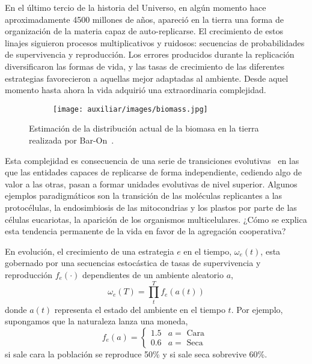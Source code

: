 \documentclass[a4paper,10pt]{article}
\begin{document}
En el último tercio de la historia del Universo, en algún momento hace aproximadamente 4500 millones de años, apareció en la tierra una forma de organización de la materia capaz de auto-replicarse.
El crecimiento de estos linajes siguieron procesos multiplicativos y ruidosos: secuencias de probabilidades de supervivencia y reproducción.
Los errores producidos durante la replicación diversificaron las formas de vida, y las tasas de crecimiento de las diferentes estrategias favorecieron a aquellas mejor adaptadas al ambiente.
Desde aquel momento hasta ahora la vida adquirió una extraordinaria complejidad.
%
\begin{figure}[H]
    \centering
    \begin{subfigure}[b]{0.65\textwidth}
    \texttt{[image: auxiliar/images/biomass.jpg]}
    \end{subfigure}
    \caption{
	Estimación de la distribución actual de la biomasa en la tierra realizada por Bar-On~\cite{barOn2018-biomass}.
    }
    \label{fig:cpr_individual}
\end{figure}
%
Esta complejidad es consecuencia de una serie de transiciones evolutivas~\cite{maynardSmith1995-majorTransitions} en las que las entidades capaces de replicarse de forma independiente, cediendo algo de valor a las otras, pasan a formar unidades evolutivas de nivel superior.
Algunos ejemplos paradigmáticos son la transición de las moléculas replicantes a las protocélulas, la endosimbiosis de las mitocondrias y los plastos por parte de las células eucariotas, la aparición de los organismos multicelulares.
¿Cómo se explica esta tendencia permanente de la vida en favor de la agregación cooperativa?

En evolución, el crecimiento de una estrategia $e$ en el tiempo, $\omega_e(t)$, esta gobernado por una secuencias estocástica de tasas de supervivencia y reproducción $f_e(\cdot)$ dependientes de un ambiente aleatorio $a$,
%
\begin{equation} \label{eq:modelo_exponencial}
\omega_e(T) = \prod_t^T f_e(a(t))
\end{equation}
%
donde $a(t)$ representa el estado del ambiente en el tiempo $t$.
Por ejemplo, supongamos que la naturaleza lanza una moneda,
\begin{equation} \label{eq:estrategia_base}
f_e(a) =
\begin{cases}
 1.5 & a = \text{ Cara } \\
 0.6 & a = \text{ Seca }
\end{cases}
\end{equation}
si sale cara la población se reproduce 50\% y si sale seca sobrevive 60\%.
\end{document}
